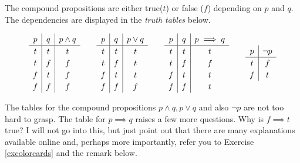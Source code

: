 The compound propositions are either true($t$) or false ($f$) depending on
$p$ and $q$. The dependencies are displayed in the \emph{truth tables} below.

\begin{tcolorbox}\begin{equation*}
    \def\arraystretch{1.2}
    \begin{array}{c|c|c}
      p & q & p\land q \\
      \hline
      t & t & t        \\
      t & f & f        \\
      f & t & f        \\
      f & f & f
    \end{array}\qquad
    \begin{array}{c|c|c}
      p & q & p\lor q \\
      \hline
      t & t & t       \\
      t & f & t       \\
      f & t & t       \\
      f & f & f
    \end{array}
    \qquad
    \begin{array}{c|c|c}
      p & q & p\implies q \\
      \hline
      t & t & t           \\
      t & f & f           \\
      f & t & t           \\
      f & f & t
    \end{array}\qquad
    \begin{array}{c|c}
      p & \neg p \\
      \hline
      t & f      \\
      f & t
    \end{array}
  \end{equation*}\end{tcolorbox}

The tables for the compound propositions $p\land q, p\lor q$ and also
$\neg p$ are not too hard to grasp. The table for $p\implies q$
raises a few more questions. Why is $f\implies t$ true?
I will not go into this, but just point out that there are
many explanations available online and,
perhaps more importantly, refer you to Exercise \ref{excolorcards} and the remark below.

